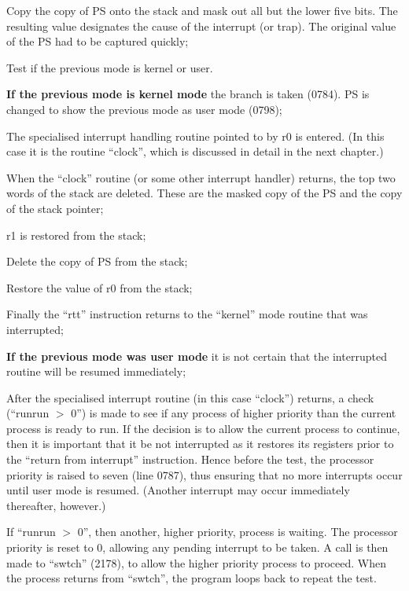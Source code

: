 \item[781:] Copy the copy of PS onto the
 stack and mask out all but the
 lower five bits. The resulting
 value designates the cause of the
 interrupt (or trap). The original value of the PS had to be
 captured quickly;

\item[0783:] Test if the previous mode is kernel or user.

{\bf If the previous mode is kernel
mode} the branch is taken (0784).
PS is changed to show the previous
mode as user mode (0798);

\item[0799:] The specialised interrupt handling routine pointed to by r0 is
entered. (In this case it is the
routine ``clock'', which is discussed in detail in the next
chapter.)

\item[0800:] When the ``clock'' routine (or some
other interrupt handler) returns,
the top two words of the stack
are deleted. These are the
masked copy of the PS and the
copy of the stack pointer;

\item[0802:] r1 is restored from the stack;

\item[0803:] Delete the copy of PS from the
 stack;

\item[0804:] Restore the value of r0 from the
 stack;

\item[0805:] Finally the ``rtt'' instruction
returns to the ``kernel'' mode
routine that was interrupted;

{\bf If the previous mode was user mode}
it is not certain that the interrupted routine will be resumed
immediately;

\item[0788:] After the specialised interrupt
routine (in this case ``clock'')
returns, a check (``runrun $>$ 0'')
is made to see if any process of
higher priority than the current
process is ready to run. If the
decision is to allow the current
process to continue, then it is
important that it be not interrupted as
it restores its registers prior to the ``return from
interrupt'' instruction. Hence
before the test, the processor
priority is raised to seven (line
0787), thus ensuring that no more
interrupts occur until user mode
is resumed. (Another interrupt
may occur immediately thereafter,
however.)
\ed


If ``runrun $>$ 0'', then another, higher
priority, process is waiting. The processor priority is reset to 0, allowing
any pending interrupt to be taken. A
call is then made to ``swtch'' (2178), to
allow the higher priority process to
proceed. When the process returns from
``swtch'', the program loops back to
repeat the test.


